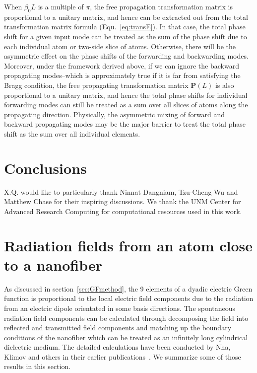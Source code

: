 \documentclass[preprint,aps,pra,onecolumn]{revtex4-1} %
\begin{document}
When $\beta_0 L$ is a multiple of $\pi$, the free propagation transformation matrix is proportional to a unitary matrix, and hence can be extracted out from the total transformation matrix formula (Equ.~\eqref{eq:transE}). In that case, the total phase shift for a given input mode can be treated as the sum of the phase shift due to each individual atom or two-side slice of atoms. Otherwise, there will be the asymmetric effect on the phase shifts of the forwarding and backwarding modes. Moreover, under the framework derived above, if we can ignore the backward propagating modes--which is approximately true if it is far from satisfying the Bragg condition, the free propagating transformation matrix $\mathbf{P}(L)$ is also proportional to a unitary matrix, and hence the total phase shifts for individual forwarding modes can still be treated as a sum over all slices of atoms along the propagating direction. Physically, the asymmetric mixing of forward and backward propagating modes may be the major barrier to treat the total phase shift as the sum over all individual elements.  


\section{Conclusions}

\begin{acknowledgments}
X.Q. would like to particularly thank Ninnat Dangniam, Tzu-Cheng Wu and Matthew Chase for their inspiring discussions. We thank the UNM Center for Advanced Research Computing for computational resources used in this work.
\end{acknowledgments}

\appendix
\section{Radiation fields from an atom close to a nanofiber}\label{app:fieldcalculation}
As discussed in section~\ref{sec:GFmethod}, the 9 elements of a dyadic electric Green function is proportional to the local electric field components due to the radiation from an electric dipole orientated in some basis directions. The spontaneous radiation field components can be calculated through decomposing the field into reflected and transmitted field components and matching up the boundary conditions of the nanofiber which can be treated as an infinitely long cylindrical dielectric medium. The detailed calculations have been conducted by Nha, Klimov and others in their earlier publications~\cite{Nha1997,Klimov2004}. We summarize some of those results in this section. 
\end{document}
